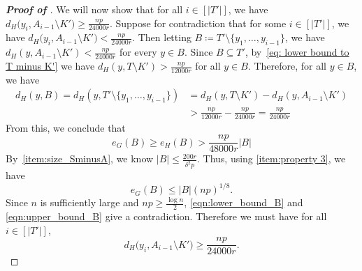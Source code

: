\documentclass[10pt,a4paper,reqno]{amsart}
\begin{document}
\begin{proof}[\textbf{Proof of }]
We will now show that for all $i \in [|T'|]$, we have $d_H\big(y_{i},A_{i-1}\setminus K' \big) \ge \frac{np}{24000r}$.
Suppose for contradiction that for some $i \in [|T'|]$, we have $d_H\big(y_{i},A_{i-1}\setminus K'\big) < \frac{np}{24000r}$. Then letting $B \coloneqq T' \setminus \{y_1,\ldots,y_{i-1}\}$, we have $d_H(y, A_{i-1}\setminus K') < \frac{np}{24000r}$ for every $y \in B$. Since $B \subseteq T'$, by~\eqref{eq: lower bound to T minus K'} we have $d_H(y,T\setminus K') > \frac{np}{12000r}$ for all $y \in B$. 
Therefore, for all $y \in B$, we have 
\begin{align*}
    d_H(y,B) = d_H(y,T'\setminus\{y_1,\ldots,y_{i-1}\}) 
    &= d_H(y,T\setminus K') - d_H(y, A_{i-1}\setminus K') \\
    &> \frac{np}{12000r} - \frac{np}{24000r} = \frac{np}{24000r}
\end{align*}
 From this, we conclude that 
 \begin{equation}\label{eqn:lower_bound_B}
 e_G(B) \ge e_H(B) > \frac{np}{48000r}|B|
 \end{equation}
 By~\ref{item:size_SminusA}, we know $|B|\le \frac{200r}{\delta^2 p}$. Thus, using \ref{item:property 3}, we have 
\begin{equation}\label{eqn:upper_bound_B}
 e_G(B)\le |B|(np)^{1/8}.
 \end{equation}
Since $n$ is sufficiently large and $np \ge \frac{\log{n}}{2}$, \eqref{eqn:lower_bound_B} and \eqref{eqn:upper_bound_B} give a contradiction. Therefore we must have for all $i \in [|T'|]$,
\begin{equation}\label{eq:lower_bound_degree_y_i}
     d_H\big(y_{i}, A_{i-1}\setminus K' \big) \ge \frac{np}{24000r}.
\end{equation}



\end{proof}
\end{document}
